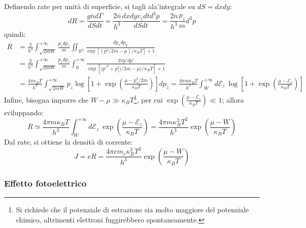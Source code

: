 \documentclass[10pt, a4paper]{scrartcl}
\numberwithin{equation}{subsection}
\theoremstyle{style1}
\begin{document}
Definendo rate per unit\`a di superficie, si tagli ala'integrale su $dS = dxdy$:
\begin{equation*}
			dR = \frac{g \overline{n} d\Gamma}{dS dt} = \frac{2 \overline{n}}{h^3} \frac{dxdy v_z dt d^3 p}{dS dt}= \frac{2\overline{n}}{h^3}\frac{p_z }{m} d^3p
\end{equation*}
quindi:
\begin{equation*}
  			\begin{split}
			 R &= \frac{2}{h^3} \int_{\sqrt{2m W} } ^{+\infty} \frac{p_z dp_z}{m} \iint_{\mathbb{R}^2}  \frac{dp_x dp_y}{\exp \left[ (p^2 / 2m - \mu ) / \kappa _ B T \right] + 1} \\
					      &= \frac{2}{h^3} \int_{\sqrt{2m W} } ^{+\infty} \frac{p_z dp_z}{m} \int_{0} ^{+\infty} \frac{2\pi p ' dp'}{\exp \left[ \big(p'^2 + p_z^2)/ 2m - \mu \big) / \kappa _ B T \right] + 1} \\
					      &= \frac{4\pi \kappa _B T }{h^3}\int_{\sqrt{2mW} } ^{+\infty} p_z\log \left[ 1+ \exp\left(\frac{\mu  - p_z^2 / 2m}{\kappa _B T}\right)  \right] dp_z  =  \frac{4 \pi m \kappa _B T }{h^3} \int_{W} ^{+\infty} d \mathscr{E}_z \ \log \left[ 1+ \exp \left(\frac{\mu - \mathscr{E}_z}{\kappa _B T}\right)  \right] 
			\end{split}
\end{equation*}
Infine, bisogna imporre che $W - \mu  \gg \kappa _B T$\footnote{Si richiede che il potenziale di estrazione sia molto maggiore del potenziale chimico, altrimenti elettroni fuggirebbero spontaneamente.}, per cui $\exp\left(\frac{\mu  - \mathscr{E}_z}{\kappa _B T}\right) \ll 1$; allora sviluppando:
\begin{equation}
	R \simeq \frac{4\pi m \kappa _B T }{h^3}\int_{W} ^{+\infty} d \mathscr{E}_z\ \exp\left( \frac{\mu  - \mathscr{E}_z}{\kappa _B T}\right) = \frac{4\pi m \kappa _B ^2 T^2}{h^3} \exp \left(\frac{\mu  - W}{\kappa _B T}\right) 
\end{equation}
Dal rate, si ottiene la densit\`a di corrente:
\begin{equation}
	J = eR = \frac{4 \pi e m_e \kappa _B ^2 T^2}{h^3} \exp \left(\frac{\mu  - W}{\kappa _B T}\right) 
\end{equation}
\subsubsection{Effetto fotoelettrico}
\end{document}
